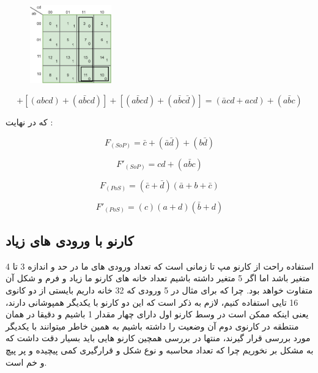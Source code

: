 \documentclass[20pt, a4paper]{article}
\begin{document}
\newpage


\begin{figure}[htbp]\centering
	\centerline{\includegraphics[width=100pt]{img/karnoughMap/p4.png}}
\end{figure}



\begin{equation}
	[(\bar{a}\bar{b}cd)+(\bar{a}bcd)]+[(abcd)+(a\bar{b}cd)]+[(a\bar{b}cd)+(a\bar{b}c\bar{d})] = (\bar{a}cd+acd)+(a\bar{b}c) 
\end{equation}

که در نهایت :

\begin{equation}
	F_{(SoP)} =  \bar{c}+(\bar{a}\bar{d})+(b\bar{d})
\end{equation}

\begin{equation}
	F'_{(SoP)} = cd + (a\bar{b}c) 
\end{equation}



\begin{equation}
	F_{(PoS)} = (\bar{c}+\bar{d}) (\bar{a}+b+\bar{c})
\end{equation}


\begin{equation}
	F'_{(PoS)}  = (c) (a+d) (\bar{b}+d)
\end{equation}


\newpage

\subsection{کارنو با ورودی های زیاد}

استفاده راحت از کارنو مپ تا زمانی است که تعداد ورودی های ما در حد و اندازه 3 تا 4 متغیر باشد
اما اگر 5 متغیر داشته باشیم تعداد خانه های کارنو ما زیاد و فرم و شکل آن متفاوت خواهد بود.
چرا که برای مثال در 5 ورودی که 32 خانه داریم بایستی از دو کانوی 16 تایی استفاده کنیم، لازم به 
ذکر است که این دو کارنو با یکدیگر همپوشانی دارند، یعنی اینکه ممکن است در وسط کارنو اول 
دارای چهار مقدار 1 باشیم و دقیقا در همان منتطقه در کارنوی دوم آن وضعیت را داشته باشیم به همین خاطر
میتوانند با یکدیگر مورد بررسی قرار گیرند، منتها در بررسی همچین کارنو هایی باید بسیار دقت داشت که
به مشکل بر نخوریم چرا که تعداد محاسبه و نوع شکل و قرارگیری کمی پیچیده و پر پیچ و خم است.
\end{document}
